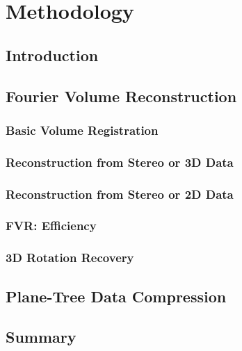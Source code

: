 \makeatletter
\chapter{Methodology}
\label{ch:Metho}

\section{Introduction}



\section{Fourier Volume Reconstruction}
\label{FVRSectionA}


\subsection{Basic Volume Registration}
\label{Sec:VolumeRegistrationSection}


\subsection{Reconstruction from Stereo or 3D Data} \label{Sec:AFVRApproach}


\subsection{Reconstruction from Stereo or 2D Data} 
\label{Sec:AMonoFVRApproach}


\subsection{FVR: Efficiency} \label{Sec:Efficiency}


\subsection{3D Rotation Recovery}
\label{FullRecovery3DSection}




\section{Plane-Tree Data Compression}
\label{sec:PlaneTreeMetho18}


\section{Summary}
